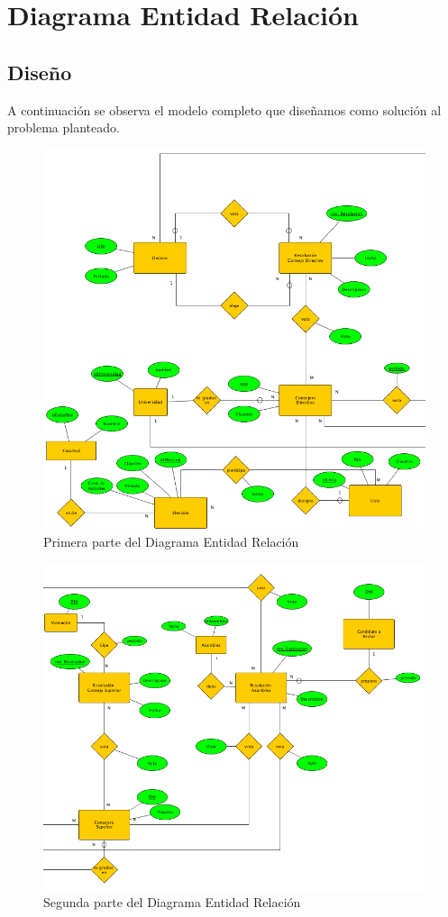 \section{Diagrama Entidad Relación}
\subsection{Diseño}
A continuación se observa el modelo completo que diseñamos como solución al problema planteado.

\begin{figure}[h!]
  \centering
  \includegraphics[width=1\textwidth]{./images/der1}
  \caption{Primera parte del Diagrama Entidad Relación}
  \label{fig:clases4}
\end{figure}

\begin{figure}[h!]
  \centering
  \includegraphics[width=1\textwidth]{./images/der2}
  \caption{Segunda parte del Diagrama Entidad Relación}
  \label{fig:clases4}
\end{figure}
\newpage
